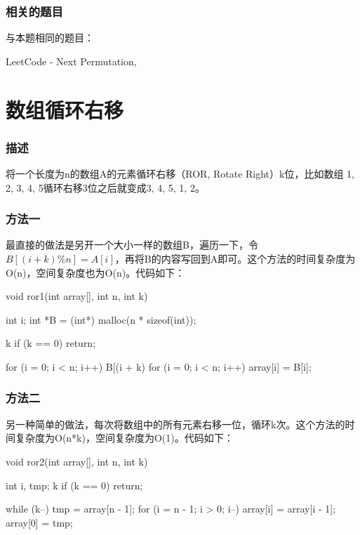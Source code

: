 \subsubsection{相关的题目}
与本题相同的题目：
\begindot
\item LeetCode -  Next Permutation, 
\myenddot


\section{数组循环右移} %

\subsubsection{描述}
将一个长度为n的数组A的元素循环右移（ROR, Rotate Right）k位，比如数组 {1, 2, 3, 4, 5}循环右移3位之后就变成{3, 4, 5, 1, 2}。

\subsubsection{方法一}
最直接的做法是另开一个大小一样的数组B，遍历一下，令$B[(i + k) \% n] = A[i]$，再将B的内容写回到A即可。这个方法的时间复杂度为O(n)，空间复杂度也为O(n)。代码如下：

\begin{Codex}[label=ror.c]
void ror1(int array[], int n, int k) {
    int i;
    int *B = (int*) malloc(n * sizeof(int));

    k %
    if (k == 0)
        return;

    for (i = 0; i < n; i++) {
        B[(i + k) %
    }
    for (i = 0; i < n; i++) {
        array[i] = B[i];
    }
}
\end{Codex}

\subsubsection{方法二}
另一种简单的做法，每次将数组中的所有元素右移一位，循环k次。这个方法的时间复杂度为O(n*k)，空间复杂度为O(1)。代码如下：

\begin{Codex}[label=ror.c]
void ror2(int array[], int n, int k) {
    int i, tmp;
    k %
    if (k == 0)
        return;

    while (k--) {
        tmp = array[n - 1];
        for (i = n - 1; i > 0; i--) {
            array[i] = array[i - 1];
        }
        array[0] = tmp;
    }
}
\end{Codex}

